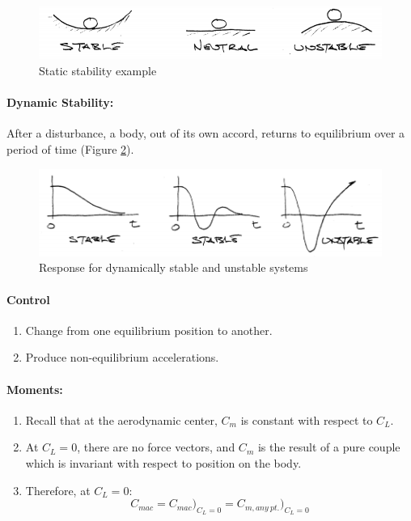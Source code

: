 \documentclass[draft=false, titlepage]{article}
\begin{document}
\begin{figure}[ht]
	\centering
	\includegraphics[width=0.8\linewidth]{Figures/p103_stability.PNG}
	\caption{Static stability example}
	\label{fig:p103_stability}
\end{figure}
\paragraph*{Dynamic Stability:} After a disturbance, a body, out of its own accord, returns to equilibrium over a period of time (Figure \ref{fig:p103_dynamicStability}).
\begin{figure}[ht]
	\centering
	\includegraphics[width=0.8\linewidth]{Figures/p103_dynamicStability.PNG}
	\caption{Response for dynamically stable and unstable systems}
	\label{fig:p103_dynamicStability}
\end{figure}

\paragraph*{Control}
\begin{enumerate}
	\item Change from one equilibrium position to another.
	\item Produce non-equilibrium accelerations.
\end{enumerate}
\paragraph*{Moments:}
\begin{enumerate}
	\item Recall that at the aerodynamic center, $C_m$ is constant with respect to $C_L$.
	\item At $C_L=0$, there are no force vectors, and $C_m$ is the result of a pure couple which is invariant with respect to position on the body.
	\item Therefore, at $C_L=0$:
	\begin{equation*}
	C_{mac} = C_{mac}\big)_{C_L=0} = C_{m,any\ pt.}\big)_{C_L=0}
	\end{equation*}
\end{enumerate}
\end{document}
